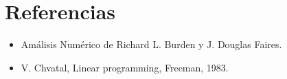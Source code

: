 \section{Referencias}

\begin{itemize}

\item Am\'alisis Num\'erico de Richard L. Burden y J. Douglas Faires.
\item V. Chvatal, Linear programming, Freeman, 1983.

\end{itemize}
